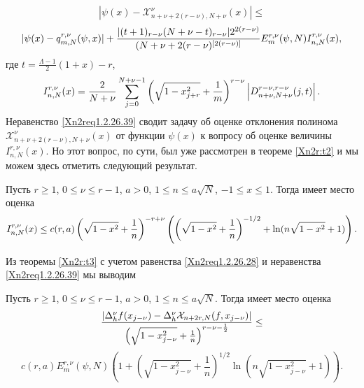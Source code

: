 $$
|\psi(x)-\mathcal{X}^\nu_{n+\nu+2(r-\nu),N+\nu}(x)|\le
$$
\begin{equation}\label{Xn2req1.2.26.39}
|\psi(x)-q_{m,N}^{r,\nu}(\psi,x)| +{|(t+1)_{r-\nu}(N+\nu-t)_{r-\nu}|2^{2(r-\nu)}\over(N+\nu+2(r-\nu)^{[2(r-\nu)]}}E_m^{r,\nu}(\psi,N)I_{n,N}^{r,\nu}(x),
\end{equation}
где $t=\frac{\Lambda-1}{2}(1+x)-r$,
\begin{equation}\label{Xn2req1.2.26.40}
 I_{n,N}^{r,\nu}(x)=\frac{2}{N+\nu}
\sum_{j=0}^{N+\nu-1}\left(\sqrt{1-x_{j+r}^2}+{1\over m}\right)^{r-\nu}\left|D_{n+\nu,N+\nu}^{r-\nu,r-\nu}(j,t)\right|.
\end{equation}
Неравенство \eqref{Xn2req1.2.26.39} сводит задачу об оценке отклонения полинома $\mathcal{X}^\nu_{n+\nu+2(r-\nu),N+\nu}(x)$ от функции $\psi(x)$
 к вопросу об оценке величины $I_{n,N}^{r,\nu}(x)$. Но этот вопрос, по сути,  был уже рассмотрен в теореме \ref{Xn2r:t2} и мы  можем здесь отметить следующий результат.

\begin{theorem}\label{Xn2r:t3}
Пусть $r\ge 1$, $0\le \nu\le r-1$, $a>0$, $1\le n\le a\sqrt{N}
$, $-1\le x \le1$. Тогда имеет место оценка
$$
I_{n,N}^{r,\nu}(x)\le
c(r,a)\left(\sqrt{1-x^2}+{1\over
n}\right)^{-r+\nu}\left(\left(\sqrt{1-x^2}+\frac1n\right)^{-1/2}+\ln(n\sqrt{1-x^2}+1)\right).
$$
\end{theorem}

Из теоремы \ref{Xn2r:t3} с учетом равенства \eqref{Xn2req1.2.26.28} и неравенства \eqref{Xn2req1.2.26.39} мы выводим

\begin{corollary}\label{Xn2r:col2}
Пусть $r\ge 1$, $0\le \nu\le r-1$, $a>0$, $1\le n\le a\sqrt{N}
$. Тогда имеет место оценка
$$
{|\Delta_h^\nu f(x_{j-\nu})-\Delta_h^\nu\mathcal{X}_{n+2r,N}(f,x_{j-\nu})|\over\left(\sqrt{1-x_{j-\nu}^2}+{1\over
n}\right)^{r-\nu-\frac12}}\le
$$
\begin{equation}\label{Xn2req1.2.26.41}
c(r,a)E_m^{r,\nu}(\psi,N)\left(1+\left(\sqrt{1-x_{j-\nu}^2}+\frac1n\right)^{1/2}\ln\left(n\sqrt{1-x_{j-\nu}^2}+1\right)\right).
\end{equation}
\end{corollary}
